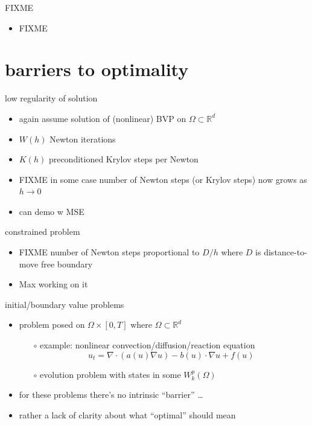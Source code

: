 \documentclass[hide notes,intlimits,usenames,dvipsnames]{beamer}
\newcommand{\RR}{\mathbb{R}}
\newcommand{\Div}{\nabla\cdot}
\newcommand{\grad}{\nabla}
\begin{document}
\begin{frame}{FIXME}
\begin{itemize}
\item FIXME
\end{itemize}
\end{frame}



\section{barriers to optimality}


\begin{frame}{low regularity of solution}
\begin{itemize}
\item again assume solution of (nonlinear) BVP on $\Omega \subset \RR^d$
\item $W(h)$ Newton iterations
\item $K(h)$ preconditioned Krylov steps per Newton
\item FIXME  in some case number of Newton steps (or Krylov steps) now grows as $h\to 0$
\item can demo w MSE
\end{itemize}
\end{frame}


\begin{frame}{constrained problem}
\begin{itemize}
\item FIXME  number of Newton steps proportional to $D/h$ where $D$ is distance-to-move free boundary
\item Max working on it
\end{itemize}
\end{frame}


\begin{frame}{initial/boundary value problems}

\begin{itemize}
\item problem posed on $\Omega \times [0,T]$ where $\Omega \subset \RR^d$
    \begin{itemize}
    \item[$\circ$] example: nonlinear convection/diffusion/reaction equation
      $$u_t = \Div(a(u) \grad u) - b(u)\cdot \grad u + f(u)$$
    \item[$\circ$] evolution problem with states in some $W_k^p(\Omega)$
    \end{itemize}
\item for these problems there's no intrinsic ``barrier'' \dots
\item rather a lack of clarity about what ``optimal'' should mean
\end{itemize}
\end{frame}
\end{document}
